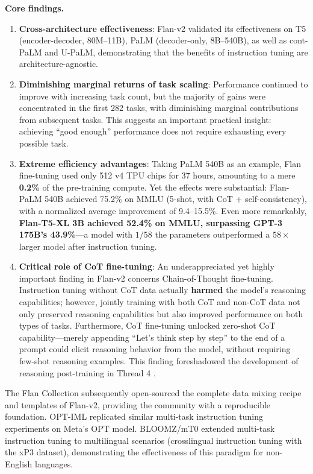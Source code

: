\textbf{Core findings.}
\begin{enumerate}[leftmargin=1.5em]
  \item \textbf{Cross-architecture effectiveness}:
    Flan-v2 validated its effectiveness on T5 (encoder-decoder, 80M--11B),
    PaLM (decoder-only, 8B--540B), as well as cont-PaLM and U-PaLM,
    demonstrating that the benefits of instruction tuning are architecture-agnostic.

  \item \textbf{Diminishing marginal returns of task scaling}:
    Performance continued to improve with increasing task count, but the majority of gains were concentrated in the first 282 tasks,
    with diminishing marginal contributions from subsequent tasks.
    This suggests an important practical insight:
    achieving ``good enough'' performance does not require exhausting every possible task.

  \item \textbf{Extreme efficiency advantages}:
    Taking PaLM 540B as an example, Flan fine-tuning used only 512 v4 TPU chips for 37 hours,
    amounting to a mere \textbf{0.2\%} of the pre-training compute.
    Yet the effects were substantial: Flan-PaLM 540B achieved 75.2\% on MMLU (5-shot, with CoT + self-consistency),
    with a normalized average improvement of 9.4--15.5\%.
    Even more remarkably, \textbf{Flan-T5-XL 3B achieved 52.4\% on MMLU, surpassing GPT-3 175B's 43.9\%}---a
    model with $1/58$ the parameters outperformed a $58\times$ larger model after instruction tuning.

  \item \textbf{Critical role of CoT fine-tuning}:
    An underappreciated yet highly important finding in Flan-v2 concerns Chain-of-Thought fine-tuning.
    Instruction tuning without CoT data actually \textbf{harmed} the model's reasoning capabilities;
    however, jointly training with both CoT and non-CoT data
    not only preserved reasoning capabilities but also improved performance on both types of tasks.
    Furthermore, CoT fine-tuning unlocked zero-shot CoT capability---merely
    appending ``Let's think step by step'' to the end of a prompt
    could elicit reasoning behavior from the model, without requiring few-shot reasoning examples.
    This finding foreshadowed the development of reasoning post-training in Thread 4
    .
\end{enumerate}

The Flan Collection \citep{longpre2023flancollection} subsequently open-sourced the complete data mixing recipe and templates of Flan-v2,
providing the community with a reproducible foundation.
OPT-IML \citep{iyer2022optiml} replicated similar multi-task instruction tuning experiments on Meta's OPT model.
BLOOMZ/mT0 \citep{muennighoff2022bloomz} extended multi-task instruction tuning
to multilingual scenarios (crosslingual instruction tuning with the xP3 dataset),
demonstrating the effectiveness of this paradigm for non-English languages.


